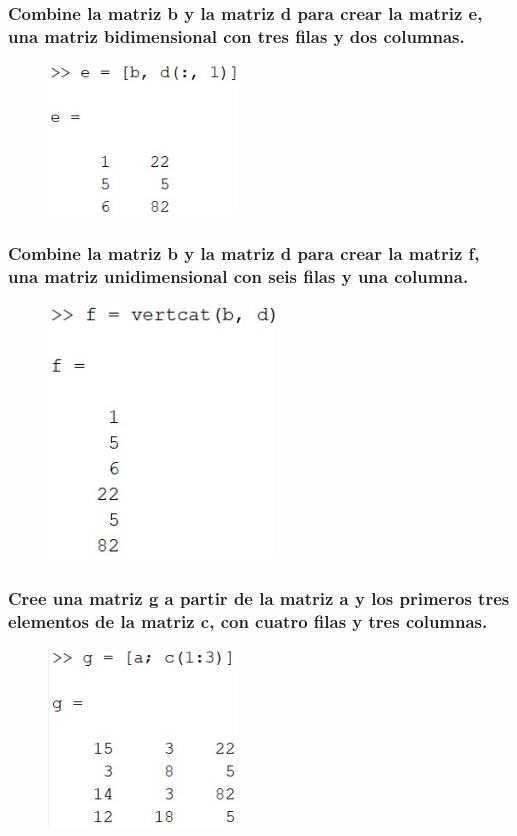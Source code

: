 \documentclass{article}
\begin{document}
\subsubsection{Combine la matriz b y la matriz d para crear la matriz e, una matriz bidimensional con tres filas y dos columnas.}
\begin{figure}[H]
    \centering
    \includegraphics[width = 5cm]{img7b.jpg}
\end{figure}

\subsubsection{Combine la matriz b y la matriz d para crear la matriz f, una matriz unidimensional con seis filas y una columna.}
\begin{figure}[H]
    \centering
    \includegraphics[width = 6cm]{img7c.jpg}
\end{figure}
\subsubsection{Cree una matriz g a partir de la matriz a y los primeros tres elementos de la matriz c, con cuatro filas y tres columnas.}
\begin{figure}[H]
    \centering
    \includegraphics[width = 5cm]{img7d.jpg}
\end{figure}
\end{document}
